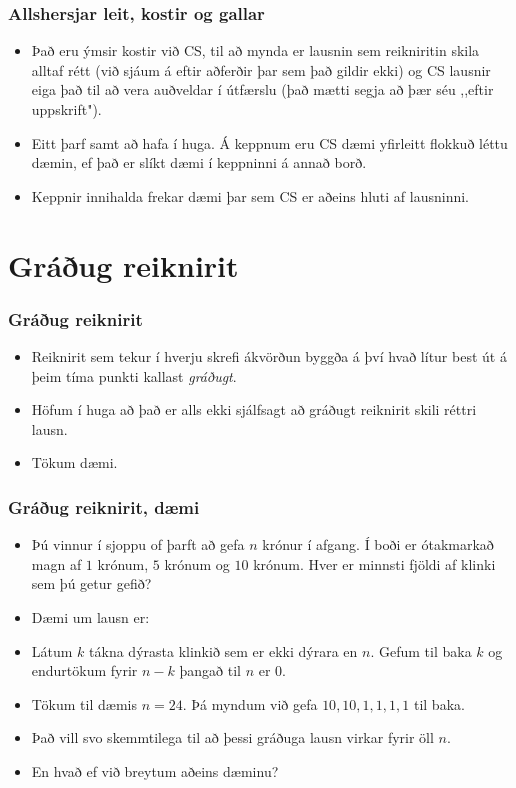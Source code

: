 \documentclass{beamer}
\begin{document}
\begin{frame}
	\frametitle{Allshersjar leit, kostir og gallar}
\begin{itemize}
	\item<1-> Það eru ýmsir kostir við CS, til að mynda er lausnin sem reikniritin skila alltaf rétt (við sjáum á eftir aðferðir þar sem það gildir ekki)
		og CS lausnir eiga það til að vera auðveldar í útfærslu (það mætti segja að þær séu ,,eftir uppskrift").
	\item<2-> Eitt þarf samt að hafa í huga. Á keppnum eru CS dæmi yfirleitt flokkuð léttu dæmin, ef það er slíkt dæmi í keppninni á annað borð.
	\item<3-> Keppnir innihalda frekar dæmi þar sem CS er aðeins hluti af lausninni.
\end{itemize}
\end{frame}

\section{Gráðug reiknirit}

\begin{frame}
	\frametitle{Gráðug reiknirit}
\begin{itemize}
	\item<1-> Reiknirit sem tekur í hverju skrefi ákvörðun byggða á því hvað lítur best út á þeim tíma punkti kallast \emph{gráðugt}.
	\item<2-> Höfum í huga að það er alls ekki sjálfsagt að gráðugt reiknirit skili réttri lausn.
	\item<3-> Tökum dæmi.
\end{itemize}
\end{frame}

\begin{frame}
	\frametitle{Gráðug reiknirit, dæmi}
\begin{itemize}
	\item<1-> 
		Þú vinnur í sjoppu of þarft að gefa $n$ krónur í afgang. 
		Í boði er ótakmarkað magn af $1$ krónum, $5$ krónum og $10$ krónum.
		Hver er minnsti fjöldi af klinki sem þú getur gefið?
	\item<2-> Dæmi um lausn er:
	\item<3-> Látum $k$ tákna dýrasta klinkið sem er ekki dýrara en $n$. Gefum til baka $k$ og endurtökum fyrir $n - k$ þangað til $n$ er $0$.
	\item<4-> Tökum til dæmis $n = 24$. Þá myndum við gefa $10, 10, 1, 1, 1, 1$ til baka.
	\item<5-> Það vill svo skemmtilega til að þessi gráðuga lausn virkar fyrir öll $n$.
	\item<6-> En hvað ef við breytum aðeins dæminu?
\end{itemize}
\end{frame}
\end{document}
